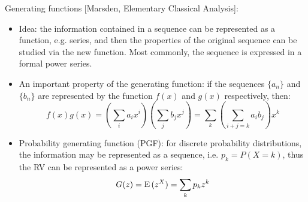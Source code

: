 \documentclass{report}
\begin{document}
Generating functions [Marsden, Elementary Classical Analysis]: 
\begin{itemize}
\item Idea: the information contained in a sequence can be represented as a function, e.g. series, and then the properties of the original sequence can be studied via the new function. Most commonly, the sequence is expressed in a formal power series. 

\item An important property of the generating function: if the sequences $\{a_n\}$ and $\{b_n\}$ are represented by the function $f(x)$ and $g(x)$ respectively, then: 
\begin{equation}
f(x) g(x) = \left( \sum_i a_i x^i \right) \left(\sum_j b_j x^j\right) = \sum_k \left( \sum_{i+j=k} a_i b_j \right) x^k	
\end{equation}

\item Probability generating function (PGF): for discrete probability distributions, the information may be represented as a sequence, i.e. $p_k = P(X = k)$, thus the RV can be represented as a power series: 
\begin{equation}
G(z) = {\rm E}\,(z^X) = \sum_k p_k z^k	
\end{equation}
\end{itemize}
 
\end{document}
